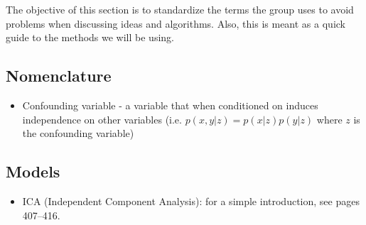 \documentclass{article}
\begin{document}
The objective of this section is to standardize the terms the group uses to avoid problems when discussing ideas and algorithms. Also, this is meant as a quick guide to the methods we will be using.

\subsection{Nomenclature\label{sec:method-nomen}}
\begin{itemize}
\item Confounding variable - a variable that when conditioned on induces independence on other variables (i.e. $p(x,y|z) = p(x|z)p(y|z)$ where $z$ is the confounding variable)
\end{itemize}


\subsection{Models\label{models}}
\begin{itemize}
\item ICA (Independent Component Analysis): for a simple introduction, see \cite{Murphy2012} pages 407--416.
\end{itemize}



\end{document}
